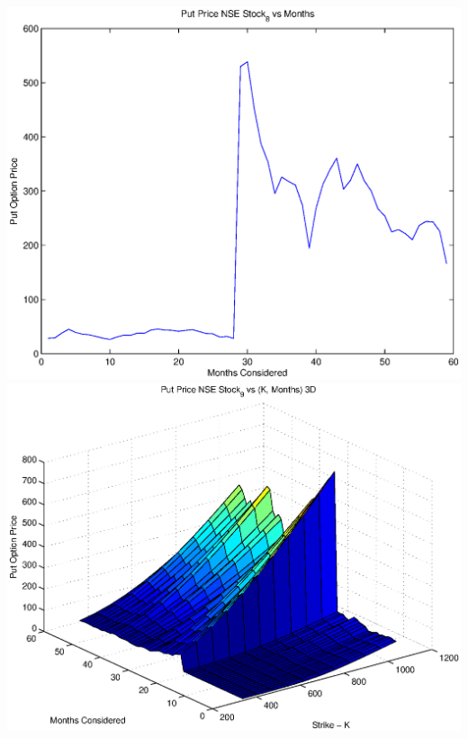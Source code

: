 \documentclass{article}
\begin{document}
\includegraphics[width=\textwidth]{Put_Price_NSE_Stock_8_vs_Months} \\

\includegraphics[width=\textwidth]{Put_Price_NSE_Stock_9_vs_(K,_Months)_3D} \\
\end{document}
